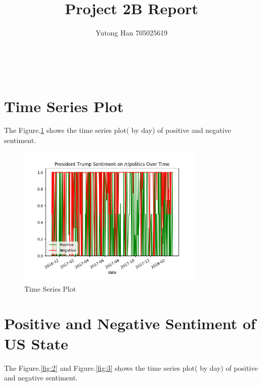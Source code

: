 \documentclass[12pt]{article}
\begin{document}
 
 
\title{Project 2B Report}
\author{Yutong Han 705025619 \\
		\\
		\\
		\\
		}
\maketitle
 
\section{Time Series Plot}
The Figure.\ref{fig:1} shows the time series plot( by day) of positive and negative sentiment.

\begin{figure}[!h]
     \begin{center}
                  \includegraphics[width=0.8\textwidth]{../plots/part1.png}
    \end{center}
    \caption{%
       Time Series Plot 
     }%
   \label{fig:1}
\end{figure}



\section{Positive and Negative Sentiment of US State}
The Figure.\ref{fig:2} and Figure.\ref{fig:3} shows the time series plot( by day) of positive and negative sentiment.
\end{document}
